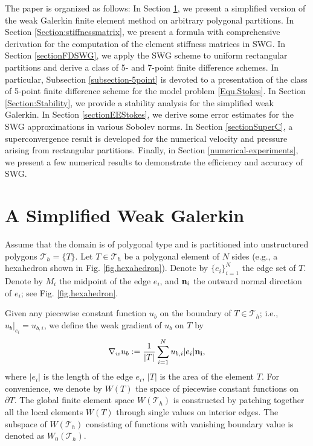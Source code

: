 \documentclass[final,leqno]{siamltex704}
\def\T{{\mathcal T}}
\def\bn{{\bf n}}
\def\pT{{\partial T}}
\begin{document}
The paper is organized as follows: In Section \ref{section.SWGpoly}, we present a simplified version of the weak Galerkin finite element method on arbitrary polygonal partitions. In Section \ref{Section:stiffnessmatrix}, we present a formula with comprehensive derivation for the computation of the element stiffness matrices in SWG. In Section \ref{sectionFDSWG}, we apply the SWG scheme to uniform rectangular partitions and derive a class of 5- and 7-point finite difference schemes. In particular, Subsection \ref{subsection-5point} is devoted to a presentation of the class of 5-point finite difference scheme for the model problem \eqref{Equ.Stokes}. In Section \ref{Section:Stability}, we provide a stability analysis for the simplified weak Galerkin. In Section \ref{sectionEEStokes}, we derive some error estimates for the SWG approximations in various Sobolev norms. In Section \ref{sectionSuperC}, a superconvergence result is developed for the numerical velocity and pressure arising from rectangular partitions. Finally, in Section \ref{numerical-experiments}, we present a few numerical results to demonstrate the efficiency and accuracy of SWG.

\section{A Simplified Weak Galerkin}\label{section.SWGpoly}
Assume that the domain is of polygonal type and is partitioned into unstructured polygons $\T_h=\{T\}$. Let $T\in \T_h$ be a polygonal element of $N$ sides (e.g., a hexahedron shown in Fig. \ref{fig.hexahedron}). Denote by $\{e_i\}_{i=1}^{N}$ the edge set of $T$. Denote by $M_i$ the midpoint of the edge $e_i$, and $\bn_i$ the outward normal direction of $e_i$; see Fig. \ref{fig.hexahedron}.

Given any piecewise constant function $u_b$ on the boundary of $T\in \T_h$; i.e.,
$u_b|_{e_i} =u_{b,i}$, we define the weak gradient of $u_b$ on $T$ by
\begin{equation}\label{DefWGpoly}
\nabla_w u_b:=\displaystyle\frac{1}{|T|}\sum_{i=1}^N u_{b,i}|e_i|\bf{n_i},
\end{equation}
where $|e_i|$ is the length of the edge $e_i$, $|T|$ is the area of the element $T$. For convenience, we denote by $W(T)$ the space of piecewise constant functions on $\pT$. The global finite element space $W(\T_h)$ is constructed by patching together all the local elements $W(T)$ through single values on interior edges. The subspace of $W(\T_h)$ consisting of functions with vanishing boundary value is denoted as $W_0(\T_h)$.
\end{document}
